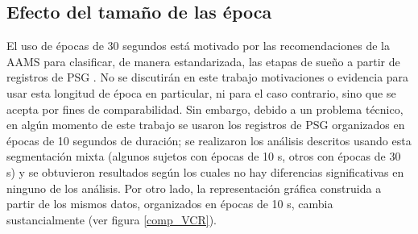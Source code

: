 \documentclass[12pt,a4paper]{mitthesis}
\begin{document}

\subsection{Efecto del tama\~no de las \'epoca}

El uso de \'epocas de 30 segundos est\'a motivado por las recomendaciones de la AAMS para 
clasificar, de manera estandarizada, las etapas de sue\~no a partir de registros de PSG 
\cite{AASM07}. 
No se discutir\'an en este trabajo motivaciones o evidencia para usar esta longitud de \'epoca en 
particular, ni para el caso contrario, sino que se acepta por fines de comparabilidad. 
Sin embargo, debido a un problema t\'ecnico, en alg\'un momento de este trabajo se usaron los 
registros de PSG organizados en \'epocas de 10 segundos de duraci\'on; se realizaron los an\'alisis 
descritos usando esta segmentaci\'on mixta (algunos sujetos con \'epocas de 10 s, otros con 
\'epocas de 30 s) y se obtuvieron resultados seg\'un los cuales no hay diferencias significativas 
en ninguno de los an\'alisis. 
Por otro lado, la representaci\'on gr\'afica construida a partir de los mismos datos, organizados
en \'epocas de 10 s, cambia sustancialmente (ver figura \ref{comp_VCR}).
\end{document}
